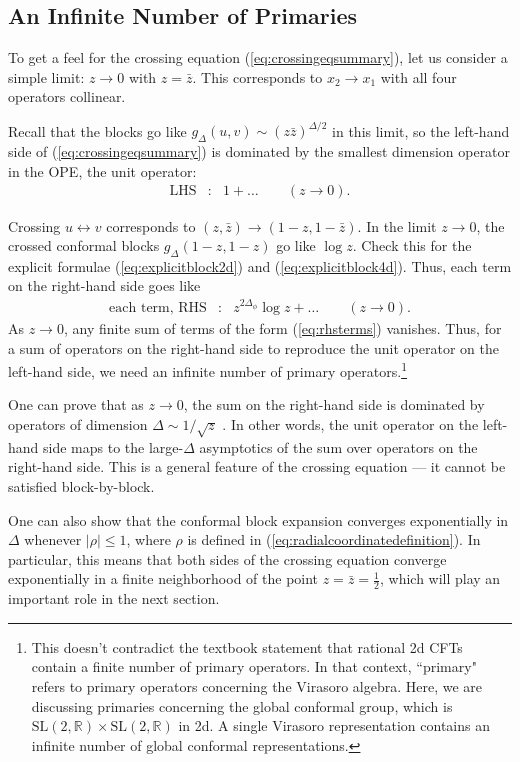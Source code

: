 \documentclass[12pt]{article}
\numberwithin{equation}{section}
\newcommand\be{\begin{eqnarray}}
\newcommand\ee{\end{eqnarray}}
\newcommand\f\phi
\newcommand\<\langle
\renewcommand\>\rangle
\newcommand\R{\mathbb{R}}
\renewcommand\.{\cdot}
\newcommand\x\times
\newcommand\De{\Delta}
\begin{document}
\subsection{An Infinite Number of Primaries}

To get a feel for the crossing equation (\ref{eq:crossingeqsummary}), let us consider a simple limit: $z\to 0$ with $z=\bar z$. This corresponds to $x_2\to x_1$ with all four operators collinear.

Recall that the blocks go like $g_{\De}(u,v)\sim (z\bar z)^{\De/2}$ in this limit, so the left-hand side of (\ref{eq:crossingeqsummary}) is dominated by the smallest dimension operator in the OPE, the unit operator:
\be
\mathrm{LHS} &:& 1+\dots \qquad(z\to 0).
\ee

Crossing $u\leftrightarrow v$ corresponds to $(z,\bar z)\to (1-z,1-\bar z)$.  In the limit $z\to 0$, the crossed conformal blocks $g_{\De}(1-z,1-z)$ go like $\log z$.
Check this for the explicit formulae (\ref{eq:explicitblock2d}) and (\ref{eq:explicitblock4d}).
Thus, each term on the right-hand side goes like
\be
\label{eq:rhsterms}
\textrm{each term, RHS} &:& z^{2\De_\f}\log z + \dots \qquad(z\to 0).
\ee
As $z\to 0$, any finite sum of terms of the form (\ref{eq:rhsterms}) vanishes.  Thus, for a sum of operators on the right-hand side to reproduce the unit operator on the left-hand side, we need an infinite number of primary operators.\footnote{This doesn't contradict the textbook statement that rational 2d CFTs contain a finite number of primary operators.  In that context, ``primary" refers to primary operators concerning the Virasoro algebra.  Here, we are discussing primaries concerning the global conformal group, which is $\mathrm{SL}(2,\R)\x\mathrm{SL}(2,\R)$ in 2d.  A single Virasoro representation contains an infinite number of global conformal representations.}

One can prove that as $z\to 0$, the sum on the right-hand side is dominated by operators of dimension $\Delta\sim 1/\sqrt z$ \cite{Pappadopulo:2012jk}.  In other words, the unit operator on the left-hand side maps to the large-$\De$ asymptotics of the sum over operators on the right-hand side.  This is a general feature of the crossing equation --- it cannot be satisfied block-by-block.

One can also show \cite{Pappadopulo:2012jk} that the conformal block expansion converges exponentially in $\De$ whenever $|\rho|\leq 1$, where $\rho$ is defined in (\ref{eq:radialcoordinatedefinition}).  In particular, this means that both sides of the crossing equation converge exponentially in a finite neighborhood of the point $z=\bar z=\frac 1 2$, which will play an important role in the next section.
\end{document}
